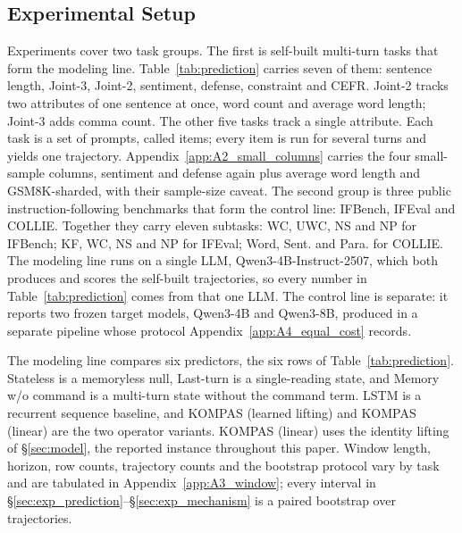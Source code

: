 \subsection{Experimental Setup}
\label{sec:exp_setup}

Experiments cover two task groups.
The first is self-built multi-turn tasks that form the modeling line.  %
Table~\ref{tab:prediction} carries seven of them: sentence length, Joint-3, Joint-2, sentiment, defense, constraint and CEFR.  %
Joint-2 tracks two attributes of one sentence at once, word count and average word length; Joint-3 adds comma count. The other five tasks track a single attribute.
Each task is a set of prompts, called items; every item is run for several turns and yields one trajectory.  %
Appendix~\ref{app:A2_small_columns} carries the four small-sample columns, sentiment and defense again plus average word length and GSM8K-sharded, with their sample-size caveat.  %
The second group is three public instruction-following benchmarks that form the control line: IFBench, IFEval and COLLIE.  %
Together they carry eleven subtasks: WC, UWC, NS and NP for IFBench; KF, WC, NS and NP for IFEval; Word, Sent. and Para. for COLLIE.  %
The modeling line runs on a single LLM, Qwen3-4B-Instruct-2507, which both produces and scores the self-built trajectories, so every number in Table~\ref{tab:prediction} comes from that one LLM. 
The control line is separate: it reports two frozen target models, Qwen3-4B and Qwen3-8B, produced in a separate pipeline whose protocol Appendix~\ref{app:A4_equal_cost} records.  




The modeling line compares six predictors, the six rows of Table~\ref{tab:prediction}.  %
Stateless is a memoryless null, Last-turn is a single-reading state, and Memory w/o command is a multi-turn state without the command term.
LSTM is a recurrent sequence baseline, and KOMPAS (learned lifting) and KOMPAS (linear) are the two operator variants.
KOMPAS (linear) uses the identity lifting of \S\ref{sec:model}, the reported instance throughout this paper.
Window length, horizon, row counts, trajectory counts and the bootstrap protocol vary by task and are tabulated in Appendix~\ref{app:A3_window}; every interval in \S\ref{sec:exp_prediction}--\S\ref{sec:exp_mechanism} is a paired bootstrap over trajectories.  %

